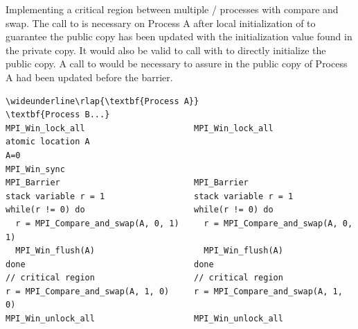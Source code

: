 \begin{example}
%
Implementing a critical region between multiple \mpi/ processes with compare
and swap.  The call to  is necessary on
Process A after local initialization of  to guarantee the public copy
has been updated with the initialization value found in the private
copy.  It would also be valid to call  with
 to directly initialize the public copy.  A call
to  would be necessary to assure  in the
public copy of Process A had been updated before the barrier.
\begin{Verbatim}[commandchars=\\\{\}]
\wideunderline\rlap{\textbf{Process A}}                                      \textbf{Process B...}
MPI_Win_lock_all                      MPI_Win_lock_all
atomic location A
A=0
MPI_Win_sync
MPI_Barrier                           MPI_Barrier
stack variable r = 1                  stack variable r = 1
while(r != 0) do                      while(r != 0) do
  r = MPI_Compare_and_swap(A, 0, 1)     r = MPI_Compare_and_swap(A, 0, 1)
  MPI_Win_flush(A)                      MPI_Win_flush(A)
done                                  done
// critical region                    // critical region
r = MPI_Compare_and_swap(A, 1, 0)     r = MPI_Compare_and_swap(A, 1, 0)
MPI_Win_unlock_all                    MPI_Win_unlock_all
\end{Verbatim}
\lstset{fancyvrb=false}
\end{example}

